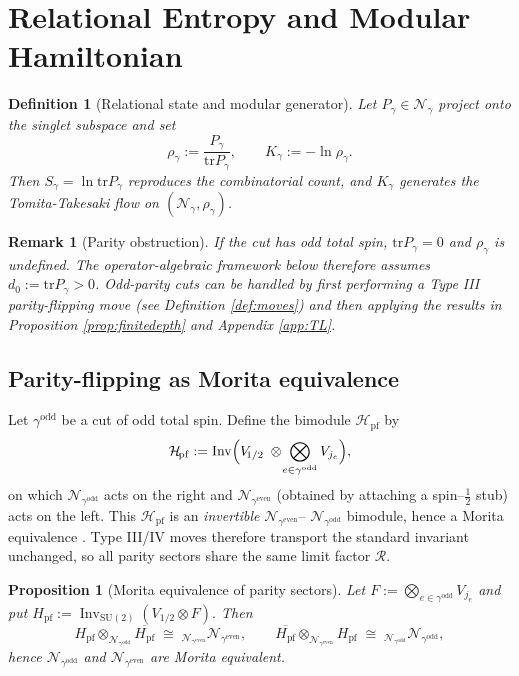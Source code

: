 \documentclass[11pt]{article}
\newtheorem{definition}{Definition}[section]
\newtheorem{proposition}{Proposition}[section]
\newtheorem{remark}{Remark}[section]
\begin{document}
\section{Relational Entropy and Modular Hamiltonian}

\begin{definition}[Relational state and modular generator]
Let $P_{\gamma}\in\mathcal N_{\gamma}$ project onto the singlet subspace and set
\[
  \rho_{\gamma}:=\frac{P_{\gamma}}{\mathrm{tr}P_{\gamma}},\qquad
  K_{\gamma}:=-\ln\rho_{\gamma}.
\]
Then $S_{\gamma}=\ln\mathrm{tr}P_{\gamma}$ reproduces the combinatorial count,
and $K_{\gamma}$ generates the Tomita-Takesaki flow on
$(\mathcal N_{\gamma},\rho_{\gamma})$.
\end{definition}

\begin{remark}[Parity obstruction]\label{rem:parity}
If the cut has \emph{odd} total spin, $\mathrm{tr}P_{\gamma}=0$ and
$\rho_{\gamma}$ is undefined.
The operator-algebraic framework below therefore assumes
$d_0:=\mathrm{tr}P_{\gamma}>0$.
Odd-parity cuts can be handled by first performing a Type III
parity-flipping move (see Definition \ref{def:moves}) and then applying the
results in Proposition \ref{prop:finitedepth} and Appendix \ref{app:TL}.
\end{remark}


\subsection*{Parity-flipping as Morita equivalence}

Let $\gamma^{\mathrm{odd}}$ be a cut of odd total spin.
Define the bimodule $\mathcal{H}_{\!\mathrm{pf}}$ by
\[
  \mathcal{H}_{\!\mathrm{pf}}
  :=\operatorname{Inv}\Bigl(
      V_{\!1/2}\;\otimes\!
      \bigotimes_{e\in\gamma^{\mathrm{odd}}}V_{j_e}
    \Bigr),
\]
on which
$\mathcal N_{\gamma^{\mathrm{odd}}}$ acts on the right and
$\mathcal N_{\gamma^{\mathrm{even}}}$ (obtained by attaching a spin–$\frac12$
stub) acts on the left.  This $\mathcal H_{\!\mathrm{pf}}$ is an
\emph{invertible} $\mathcal N_{\gamma^{\mathrm{even}}}$–%
$\mathcal N_{\gamma^{\mathrm{odd}}}$ bimodule, hence a Morita equivalence
\cite[Def.~2.1]{PopaCBMS}.  Type III/IV moves therefore transport the standard
invariant unchanged, so all parity sectors share the same limit factor
$\mathcal R$.

\begin{proposition}[Morita equivalence of parity sectors]\label{prop:Morita}
Let
\(
   F:=\bigotimes_{e\in\gamma^{\mathrm{odd}}} V_{j_e}
\)
and put
\(
   H_{\mathrm{pf}}
   :=\operatorname{Inv}_{\mathrm{SU}(2)}(V_{1/2}\!\otimes\!F).
\)
Then
\[
  H_{\mathrm{pf}}\!\otimes_{\mathcal N_{\gamma^{\mathrm{odd}}}}
  \overline{H_{\mathrm{pf}}}
  \;\cong\;
  {}_{\mathcal N_{\gamma^{\mathrm{even}}}}\mathcal N_{\gamma^{\mathrm{even}}},
  \qquad
  \overline{H_{\mathrm{pf}}}\!\otimes_{\mathcal N_{\gamma^{\mathrm{even}}}}
  H_{\mathrm{pf}}
  \;\cong\;
  {}_{\mathcal N_{\gamma^{\mathrm{odd}}}}\mathcal N_{\gamma^{\mathrm{odd}}},
\]
hence $\mathcal N_{\gamma^{\mathrm{odd}}}$ and
$\mathcal N_{\gamma^{\mathrm{even}}}$ are Morita equivalent.
\end{proposition}
\end{document}
